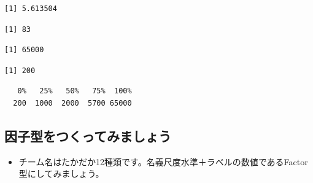 \documentclass[
  a4paper,
]{ltjsbook}
\newenvironment{Shaded}{\begin{snugshade}}{\end{snugshade}}
\newcommand{\FunctionTok}[1]{\textcolor[rgb]{0.28,0.35,0.67}{#1}}
\newcommand{\NormalTok}[1]{\textcolor[rgb]{0.00,0.23,0.31}{#1}}
\newcommand{\SpecialCharTok}[1]{\textcolor[rgb]{0.37,0.37,0.37}{#1}}
\providecommand{\tightlist}{%
  \setlength{\itemsep}{0pt}\setlength{\parskip}{0pt}}\usepackage{longtable,booktabs,array}
\begin{document}
\begin{verbatim}
[1] 5.613504
\end{verbatim}

\begin{Shaded}
\end{Shaded}

\begin{verbatim}
[1] 83
\end{verbatim}

\begin{Shaded}
\end{Shaded}

\begin{verbatim}
[1] 65000
\end{verbatim}

\begin{Shaded}
\end{Shaded}

\begin{verbatim}
[1] 200
\end{verbatim}

\begin{Shaded}
\end{Shaded}

\begin{verbatim}
   0%   25%   50%   75%  100% 
  200  1000  2000  5700 65000 
\end{verbatim}

\subsection{因子型をつくってみましょう}\label{ux56e0ux5b50ux578bux3092ux3064ux304fux3063ux3066ux307fux307eux3057ux3087ux3046}

\begin{itemize}
\tightlist
\item
  チーム名はたかだか12種類です。名義尺度水準＋ラベルの数値であるFactor型にしてみましょう。
\end{itemize}
\end{document}
